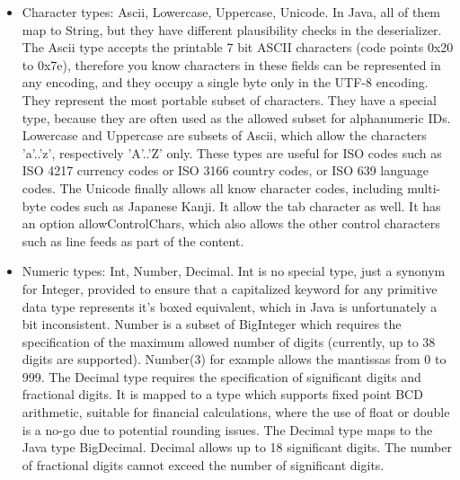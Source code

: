 \documentclass[11pt,a4paper,oneside]{article}
\begin{document}
\begin{itemize}
  \item Character types:  {\ttfamily Ascii}, {\ttfamily Lowercase}, {\ttfamily Uppercase}, {\ttfamily Unicode}. In Java, all of them map to {\ttfamily String},
   but they have different plausibility checks in the deserializer. The {\ttfamily Ascii} type accepts the printable 7 bit ASCII characters
    (code points 0x20 to 0x7e), therefore you know characters in these fields can be represented in any encoding, and they
    occupy a single byte only in the UTF-8 encoding. They represent the most portable subset of characters. They have a special type, because they are often used as the allowed subset for
      alphanumeric IDs. {\ttfamily Lowercase} and {\ttfamily Uppercase} are subsets of {\ttfamily Ascii}, which allow the characters {\ttfamily 'a'..'z'},
      respectively {\ttfamily 'A'..'Z'} only. These types are useful for ISO codes such as ISO 4217 currency codes or ISO 3166
      country codes, or ISO 639 language codes.
      The {\ttfamily Unicode} finally allows all know character codes, including multi-byte codes such as Japanese Kanji. It
      allow the tab character as well.
      It has an option {\ttfamily allowControlChars}, which also allows the other control characters such as line feeds as part of the content.
  \item Numeric types: {\ttfamily Int}, {\ttfamily Number}, {\ttfamily Decimal}.  {\ttfamily Int} is no special type, just a synonym for {\ttfamily Integer},
      provided to ensure that a capitalized keyword for any primitive data type represents it's boxed equivalent, which in Java is unfortunately a bit inconsistent.
      {\ttfamily Number} is a subset of {\ttfamily BigInteger} which requires the specification of the maximum allowed number of
      digits (currently, up to 38 digits are supported). {\ttfamily Number(3)} for example allows the mantissas from 0 to 999.
      The {\ttfamily Decimal} type requires the specification of significant digits and fractional digits. It is mapped to a type which supports fixed point BCD arithmetic, suitable for
      financial calculations, where the use of {\ttfamily float} or {\ttfamily double} is a no-go due to potential rounding issues. The {\ttfamily Decimal} type
      maps to the Java type BigDecimal. {\ttfamily Decimal} allows up to 18 significant digits. The number of fractional digits cannot exceed the number of significant digits.
      

\end{itemize}
\end{document}
